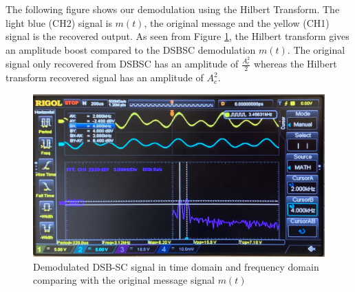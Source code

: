 \documentclass[11pt]{article}
\begin{document}
\begin{enumerate}[label=(\alph*)]
The following figure shows our demodulation using the Hilbert Transform. The light blue (CH2) signal is $m(t)$, the original message and the yellow (CH1) signal is the recovered output. As seen from Figure \ref{fig:q3e}, the Hilbert transform gives an amplitude boost compared to the DSBSC demodulation $m(t)$. The original signal only recovered from DSBSC has an amplitude of $\frac{A_c^2}{2}$ whereas the Hilbert transform recovered signal has an amplitude of $A_c^2$.
\begin{figure}[H]
    \centering
    \includegraphics[scale = 0.18]{Q3e.jpg}
    \caption{\label{fig:q3e}Demodulated DSB-SC signal in time domain and frequency domain comparing with the original message signal $m(t)$}
\end{figure}
\end{enumerate}

\newpage
\end{document}
